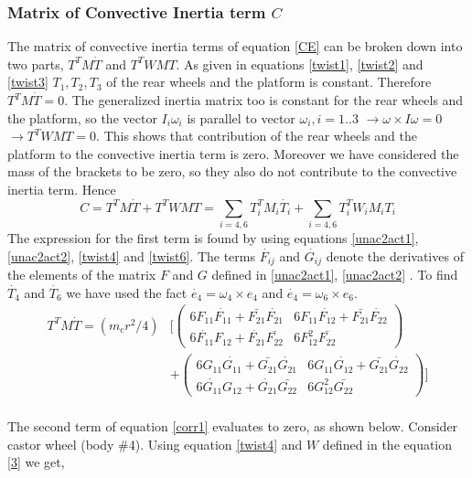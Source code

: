 \subsubsection{Matrix of Convective Inertia term $C$}
The matrix of convective inertia terms of equation \ref{CE} can be broken down into two parts, $T^TM\dot{T}$ and $T^TWMT$.  As given in equations \ref{twist1}, \ref{twist2} and \ref{twist3} $T_1,T_2,T_3$ of the rear wheels and the platform is constant. Therefore $T^TM\dot{T}=0$. The generalized inertia matrix too is constant for the rear wheels and the platform, so the vector $I_i\omega_i$ is parallel to vector $\omega_i, i=1..3$ $\rightarrow\omega\times I\omega=0$ $\rightarrow T^TWMT =0$. This shows that contribution of the rear wheels and the platform  to the convective inertia term is zero. Moreover we have considered the mass of the brackets to be zero, so they also do not contribute to the convective inertia term. Hence
\begin{equation}
\label{Convective}
C=T^TM\dot{T}+T^TWMT=\sum_{i=4,6}T^T_iM_i\dot{T_i}+\sum_{i=4,6}T_i^TW_iM_iT_i
\end{equation}
The expression for the first term is found by using equations \ref{unac2act1}, \ref{unac2act2}, \ref{twist4} and \ref{twist6}. The terms $\dot{F_{ij}}$ and $\dot{G_{ij}}$ denote the derivatives of the elements of the matrix $F$ and $G$ defined in \ref{unac2act1}, \ref{unac2act2} . To find $\dot{T_4}$ and  $ \dot{T_6}$ we have used the fact $\dot{e_4}=\omega_4 \times e_4 $ and $\dot{e_4}=\omega_6 \times e_6 $. 
\begin{equation}
\label{corr1}
\begin{split}
T^TM\dot{T}=
(m_cr^2/4)& \biggl[ \begin{pmatrix}
6F_{11}\dot{F_{11}}+\bar{F_{21}}\dot{F_{21}} & 6F_{11}\dot{F_{12}}+\bar{F_{21}}\dot{F_{22}}\\
6\dot{F_{11}}F_{12}+\dot{F_{21}}\bar{F_{22}} & 6F_{12}^2\bar{F_{22}}
\end{pmatrix}\\
&+\begin{pmatrix}
6G_{11}\dot{G_{11}}+\bar{G_{21}}\dot{G_{21}} & 6G_{11}\dot{G_{12}}+\bar{G_{21}}\dot{G_{22}}\\
6\dot{G_{11}}G_{12}+\dot{G_{21}}\bar{G_{22}} & 6G_{12}^2\bar{G_{22}}
\end{pmatrix} \biggr]
\end{split}
\end{equation}
\\
The second term of equation \ref{corr1} evaluates to zero, as shown below. Consider castor wheel (body \#4). Using equation \ref{twist4} and  $W$ defined in the equation \ref{3} we get,
